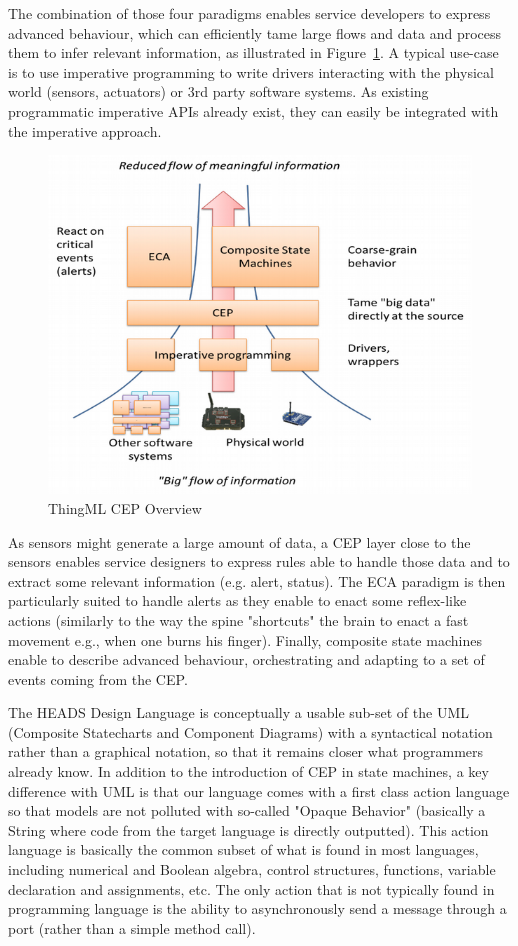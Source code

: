 The combination of those four paradigms enables service developers to express advanced behaviour, which can efficiently tame large flows and data and process them to infer relevant information, as illustrated in Figure~\ref{fig:fig1}. A typical use-case is to use imperative programming to write drivers interacting with the physical world (sensors, actuators) or 3rd party software systems. As existing programmatic imperative APIs already exist, they can easily be integrated with the imperative approach. 

\begin{figure}[h]
\centering
\includegraphics[width=1\linewidth]{figures/fig1}
\caption[ThingML CEP Overview]{ThingML CEP Overview}
\label{fig:fig1}
\end{figure}


As sensors might generate a large amount of data, a CEP layer close to the sensors enables service designers to express rules able to handle those data and to extract some relevant information (e.g. alert, status). The ECA paradigm is then particularly suited to handle alerts as they enable to enact some reflex-like actions (similarly to the way the spine "shortcuts" the brain to enact a fast movement e.g., when one burns his finger). Finally, composite state machines enable to describe advanced behaviour, orchestrating and adapting to a set of events coming from the CEP. 

The HEADS Design Language is conceptually a usable sub-set of the UML (Composite Statecharts and Component Diagrams) with a syntactical notation rather than a graphical notation, so that it remains closer what programmers already know. In addition to the introduction of CEP in state machines, a key difference with UML is that our language comes with a first class action language so that models are not polluted with so-called "Opaque Behavior" (basically a String where code from the target language is directly outputted). This action language is basically the common subset of what is found in most languages, including numerical and Boolean algebra, control structures, functions, variable declaration and assignments, etc. The only action that is not typically found in programming language is the ability to asynchronously send a message through a port (rather than a simple method call). 

